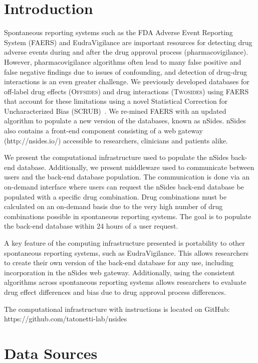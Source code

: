 \documentclass{ws-procs11x85}
\begin{document}
\bodymatter

\section{Introduction}

Spontaneous reporting systems such as the FDA Adverse Event Reporting
System (FAERS) and EudraVigilance are important resources for
detecting drug adverse events during and after the drug approval
process (pharmacovigilance). However, pharmacovigilance algorithms
often lead to many false positive and false negative findings due to
issues of confounding, and detection of drug-drug interactions is an
even greater challenge.  We previously developed databases for
off-label drug effects (O\textsc{ffsides}) and drug interactions
(T\textsc{wosides}) using FAERS that account for these limitations
using a novel Statistical Correction for Uncharacterized Bias
(SCRUB)~\cite{Tatonetti2012}.  We re-mined FAERS with an updated
algorithm to populate a new version of the databases, known as nSides.
nSides also contains a front-end component consisting of a web gateway
(http://nsides.io/) accessible to researchers, clinicians and patients
alike.

We present the computational infrastructure used to populate the
nSides back-end database.  Additionally, we present middleware used to
communicate between users and the back-end database population.  The
communication is done via an on-demand interface where users can
request the nSides back-end database be populated with a specific drug
combination. Drug combinations must be calculated on an on-demand
basis due to the very high number of drug combinations possible in
spontaneous reporting systems. The goal is to populate the back-end
database within 24 hours of a user request.

A key feature of the computing infrastructure presented is portability
to other spontaneous reporting systems, such as EudraVigilance.  This
allows researchers to create their own version of the back-end
database for any use, including incorporation in the nSides web
gateway.  Additionally, using the consistent algorithms across
spontaneous reporting systems allows researchers to evaluate drug
effect differences and bias due to drug approval process differences.

The computational infrastructure with instructions is located on GitHub: https://github.com/tatonetti-lab/nsides


\section{Data Sources}
\end{document}
